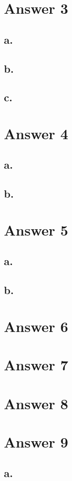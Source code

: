\documentclass[12pt]{article}
\begin{document}
\section*{Answer 3}


\subsection*{a.}

\subsection*{b.}

\subsection*{c.}




\section*{Answer 4}

\subsection*{a.}

\subsection*{b.}




\section*{Answer 5}

\subsection*{a.}

\subsection*{b.}



\section*{Answer 6}



\section*{Answer 7}



\section*{Answer 8}



\section*{Answer 9}

\subsection*{a.}
\end{document}
